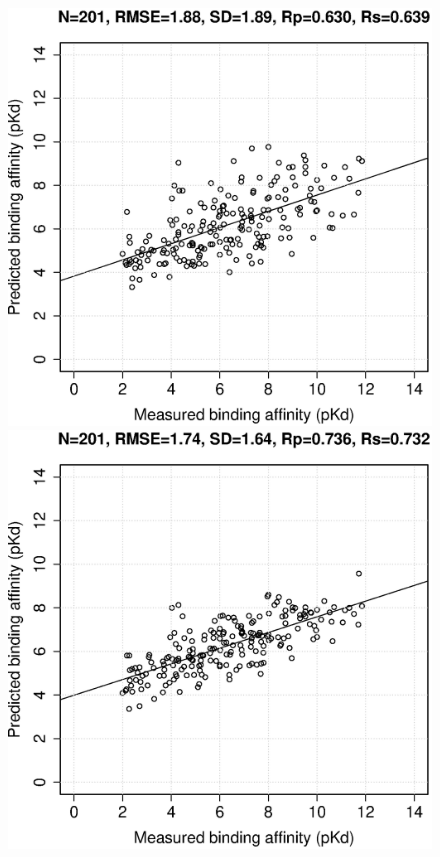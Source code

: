 \documentclass[journal=jacsat,manuscript=article]{achemso}
\begin{document}
\begin{figure}[ht!]
\endminipage
\\
\includegraphics[width=\linewidth]{../rfcyscore/x4/mlr/trn-247-tst-201-yp.eps}
\endminipage
{}
\includegraphics[width=\linewidth]{../rfcyscore/x46/rf/trn-2696-tst-201-yp.eps}

\end{figure}
\end{document}
